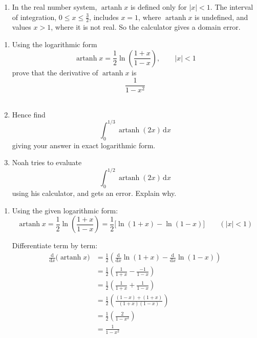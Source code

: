 \documentclass[leqno]{article}
\begin{document}
\begin{enumerate}[
  label=\textbf{\arabic*.},
  leftmargin=*,
  topsep=0pt,
  partopsep=0pt,
  parsep=0pt
]
\begin{djsSolution}
\begin{enumerate}[label=\textbf{(\alph*)}]
Also
\[
\frac34\ln 3-\ln 2=\frac14\ln\left(\frac{27}{16}\right)
\]

Therefore
\[
\int_0^{1/2}\operatorname{artanh} x\,\mathrm{d}x=\frac34\ln 3-\ln 2=\frac14\ln\left(\frac{27}{16}\right)
\]

  \item In the real number system, \(\operatorname{artanh} x\) is defined only for \(|x|<1\). The interval of integration, \(0\le x\le\frac32\), includes \(x=1\), where \(\operatorname{artanh} x\) is undefined, and values \(x>1\), where it is not real. So the calculator gives a domain error.
\end{enumerate}
\end{djsSolution}


\newpage

\questionitem

\begin{enumerate}[label=\textbf{(\alph*)}]
  \item Using the logarithmic form
  \[
  \operatorname{artanh} x = \frac{1}{2}\ln\left(\frac{1+x}{1-x}\right),\qquad |x|<1
  \]
  prove that the derivative of $\operatorname{artanh} x$ is
  \[
  \frac{1}{1-x^2}
  \]
   \\
  \item Hence find
  \[
  \int_0^{1/3} \operatorname{artanh}(2x)\,\mathrm{d}x
  \]
  giving your answer in exact logarithmic form.  \\
  \item Noah tries to evaluate
  \[
  \int_0^{1/2} \operatorname{artanh}(2x)\,\mathrm{d}x
  \]
  using his calculator, and gets an error. Explain why.  \\
\end{enumerate}

\vspace*{10pt}

\begin{djsSolution}
\begin{enumerate}[label=\textbf{(\alph*)}]
  \item Using the given logarithmic form:
\[
\operatorname{artanh}x=\frac12\ln\left(\frac{1+x}{1-x}\right)
=\frac12\bigl[\ln(1+x)-\ln(1-x)\bigr]\qquad (|x|<1)
\]

Differentiate term by term:
\begin{align*}
\frac{\mathrm{d}}{\mathrm{d}x}\bigl(\operatorname{artanh}x\bigr)
&=\frac12\left(\frac{\mathrm{d}}{\mathrm{d}x}\ln(1+x)-\frac{\mathrm{d}}{\mathrm{d}x}\ln(1-x)\right)\\
&=\frac12\left(\frac{1}{1+x}-\frac{-1}{1-x}\right)\\
&=\frac12\left(\frac{1}{1+x}+\frac{1}{1-x}\right)\\
&=\frac12\left(\frac{(1-x)+(1+x)}{(1+x)(1-x)}\right)\\
&=\frac12\left(\frac{2}{1-x^2}\right)\\
&=\frac{1}{1-x^2}
\end{align*}


\end{enumerate}
\end{djsSolution}
\end{enumerate}
\end{document}
